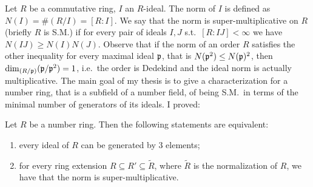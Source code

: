 \documentclass[a4paper,12pt]{amsart} %
\begin{document}
%
%

Let $R$ be a commutative ring, $I$ an $R$-ideal. The norm of $I$ is defined as $N(I) = \#\left(R/I\right) = [R:I]$. We say that the norm is super-multiplicative on $R$ (briefly $R$ is S.M.) if for every pair of ideals $I,J$ s.t.\ $[R:IJ]<\infty$ we have $N(IJ)\geq N(I)N(J)$. Observe that if  the norm of an order $R$ satisfies the other inequality for every maximal ideal ${\mathfrak p}$, that is $N({\mathfrak p}^2)\leq N({\mathfrak p})^2$,  then $\dim_{(R/{\mathfrak p})}({\mathfrak p}/{\mathfrak p}^2)= 1$, i.e.\ the order is Dedekind and the ideal norm is actually multiplicative. The main goal of my thesis is to give a characterization for a number ring, that is a subfield of a number field, of being S.M.\ in terms of the minimal number of generators of its ideals. I proved:
\begin{thm*}
Let $R$ be a number ring. Then the following statements are equivalent:
\begin{enumerate}
\item \label{impl:1} every ideal of $R$ can be generated by $3$ elements;
\item \label{impl:2} for every ring extension $R\subseteq  R'\subseteq \tilde{R}$, where $\tilde{R}$ is the normalization of $R$, we have that the norm is super-multiplicative.
\end{enumerate}
\end{thm*}
\end{document}
